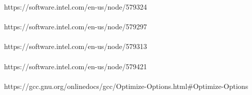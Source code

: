\documentclass{article}
\begin{document}
\noindent [1] https://software.intel.com/en-us/node/579324 \\ \\
\noindent [2] https://software.intel.com/en-us/node/579297 \\ \\
\noindent [3] https://software.intel.com/en-us/node/579313 \\ \\
\noindent [4] https://software.intel.com/en-us/node/579421 \\ \\
\noindent [5]  https://gcc.gnu.org/onlinedocs/gcc/Optimize-Options.html\#Optimize-Options \\  \\
\end{document}
